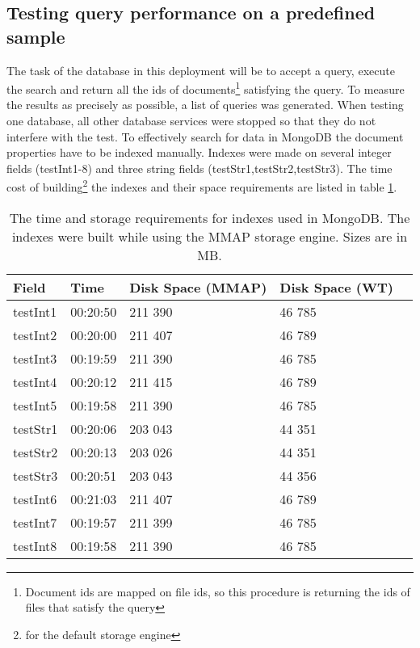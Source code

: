 \subsection{Testing query performance on a predefined sample}

The task of the database in this deployment will be to accept a query, execute the search and return all the 
ids of documents\footnote{Document ids are mapped on file ids, so this procedure is returning the ids of files
that satisfy the query} satisfying the query. To measure the results as precisely as possible, a list of
queries was generated. When testing one database, all other database services were stopped so that they do not
interfere with the test. To effectively search for data in MongoDB the document properties have to be 
indexed manually. Indexes were made on several integer fields (testInt1-8) and three string fields 
(testStr1,testStr2,testStr3). The time cost of building\footnote{for the default storage engine} the 
indexes and their space requirements are listed in table \ref{tab:indexBuildTimes}.

\begin{table}[h]
\centering
\begin{tabular}{|l|l|l|l|l|}
\hline
Field    & Time     & Disk Space (MMAP) & Disk Space (WT) \\ \hline
testInt1 & 00:20:50 & 211 390           & 46 785          \\ \hline
testInt2 & 00:20:00 & 211 407           & 46 789          \\ \hline
testInt3 & 00:19:59 & 211 390           & 46 785          \\ \hline
testInt4 & 00:20:12 & 211 415           & 46 789          \\ \hline
testInt5 & 00:19:58 & 211 390           & 46 785          \\ \hline
testStr1 & 00:20:06 & 203 043           & 44 351          \\ \hline
testStr2 & 00:20:13 & 203 026           & 44 351          \\ \hline
testStr3 & 00:20:51 & 203 043           & 44 356          \\ \hline
testInt6 & 00:21:03 & 211 407           & 46 789          \\ \hline
testInt7 & 00:19:57 & 211 399           & 46 785          \\ \hline
testInt8 & 00:19:58 & 211 390           & 46 785          \\ \hline
\end{tabular}
\caption{The time and storage requirements for indexes used in MongoDB. The indexes were built while using
the MMAP storage engine. Sizes are in MB.}
\label{tab:indexBuildTimes}
\end{table}

